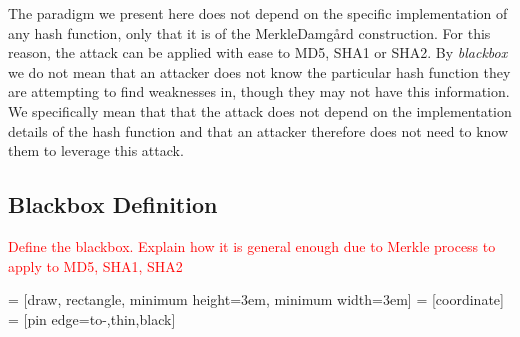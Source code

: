 The paradigm we present here does not depend on the specific implementation of any hash function, only that it is of the Merkle{\textendash}Damg\r{a}rd construction. For this reason, the attack can be applied with ease to MD5, SHA1 or SHA2. By \emph{blackbox} we do not mean that an attacker does not know the particular hash function they are attempting to find weaknesses in, though they may not have this information. We specifically mean that that the attack does not depend on the implementation details of the hash function and that an attacker therefore does not need to know them to leverage this attack. 

\subsection{Blackbox Definition} \label{bbdef}
\textcolor{red}{Define the blackbox. Explain how it is general enough due to Merkle process to apply to MD5, SHA1, SHA2}

 = [draw, rectangle, minimum height=3em, minimum width=3em]
 = [coordinate]
 = [pin edge={to-,thin,black}]
\begin{center}
\end{center}

